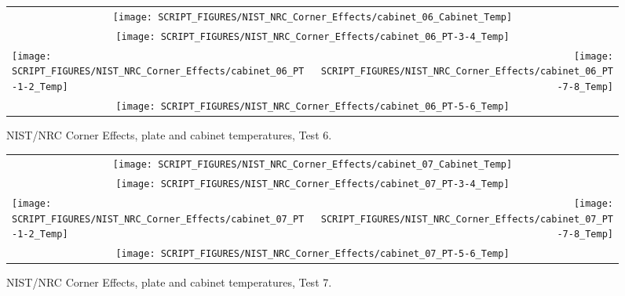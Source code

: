 \begin{figure}[p]
\begin{tabular*}{\textwidth}{l@{\extracolsep{\fill}}r}
\multicolumn{2}{c}{\texttt{[image: SCRIPT\_FIGURES/NIST\_NRC\_Corner\_Effects/cabinet\_06\_Cabinet\_Temp]}} \\
\multicolumn{2}{c}{\texttt{[image: SCRIPT\_FIGURES/NIST\_NRC\_Corner\_Effects/cabinet\_06\_PT-3-4\_Temp]}} \\
\texttt{[image: SCRIPT\_FIGURES/NIST\_NRC\_Corner\_Effects/cabinet\_06\_PT-1-2\_Temp]} &
\texttt{[image: SCRIPT\_FIGURES/NIST\_NRC\_Corner\_Effects/cabinet\_06\_PT-7-8\_Temp]} \\
\multicolumn{2}{c}{\texttt{[image: SCRIPT\_FIGURES/NIST\_NRC\_Corner\_Effects/cabinet\_06\_PT-5-6\_Temp]}}
\end{tabular*}
\caption[NIST/NRC Corner Effects, plate and cabinet temperatures, Test 6]{NIST/NRC Corner Effects, plate and cabinet temperatures, Test 6.}
\label{NIST_NRC_Cabinet_PT_Test_6}
\end{figure}

\begin{figure}[p]
\begin{tabular*}{\textwidth}{l@{\extracolsep{\fill}}r}
\multicolumn{2}{c}{\texttt{[image: SCRIPT\_FIGURES/NIST\_NRC\_Corner\_Effects/cabinet\_07\_Cabinet\_Temp]}} \\
\multicolumn{2}{c}{\texttt{[image: SCRIPT\_FIGURES/NIST\_NRC\_Corner\_Effects/cabinet\_07\_PT-3-4\_Temp]}} \\
\texttt{[image: SCRIPT\_FIGURES/NIST\_NRC\_Corner\_Effects/cabinet\_07\_PT-1-2\_Temp]} &
\texttt{[image: SCRIPT\_FIGURES/NIST\_NRC\_Corner\_Effects/cabinet\_07\_PT-7-8\_Temp]} \\
\multicolumn{2}{c}{\texttt{[image: SCRIPT\_FIGURES/NIST\_NRC\_Corner\_Effects/cabinet\_07\_PT-5-6\_Temp]}}
\end{tabular*}
\caption[NIST/NRC Corner Effects, plate and cabinet temperatures, Test 7]{NIST/NRC Corner Effects, plate and cabinet temperatures, Test 7.}
\label{NIST_NRC_Cabinet_PT_Test_7}
\end{figure}

